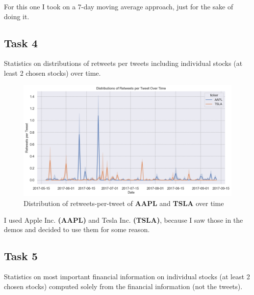 \documentclass[12pt]{article}
\begin{document}
For this one I took on a 7-day moving average approach, just for
the sake of doing it.

\pagebreak

\subsection{Task 4}

\begin{qsolve}[Task]
    Statistics on distributions of retweets per tweets including 
    individual stocks (at least 2 chosen stocks) over time.
\end{qsolve}

\begin{figure}[h!]
    \centering
    \includegraphics[width=1\textwidth]{P1.4.png}
    \caption{Distribution of retweets-per-tweet of \textbf{AAPL} and \textbf{TSLA} over time}
    \label{fig:1.4}
\end{figure}

I used Apple Inc. \textbf{(AAPL)} and Tesla Inc. \textbf{(TSLA)},
because I saw those in the demos and decided to use them for some reason.

\pagebreak

\subsection{Task 5}

\begin{qsolve}[Task]
    Statistics on most important financial information on 
    individual stocks (at least 2 chosen stocks) computed 
    solely from the financial information (not the tweets).
\end{qsolve}
\end{document}
